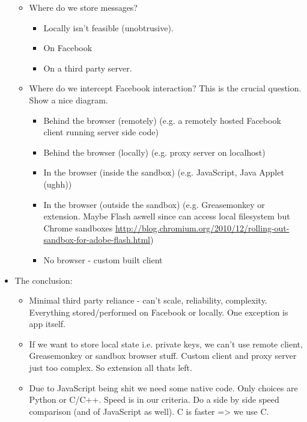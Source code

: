 \begin{itemize}
\begin{itemize}
        \item Where do we store messages?
            \begin{itemize}
                \item Locally isn't feasible (unobtrusive).
                \item On Facebook
                \item On a third party server.
            \end{itemize}
                
        \item Where do we intercept Facebook interaction? This is the crucial question. Show a nice diagram.
            \begin{itemize}
                \item Behind the browser (remotely) (e.g. a remotely hosted Facebook client running server side code)
                \item Behind the browser (locally) (e.g. proxy server on localhost)
                \item In the browser (inside the sandbox) (e.g. JavaScript, Java Applet (ughh))
                \item In the browser (outside the sandbox) (e.g. Greasemonkey or extension. Maybe Flash aswell since can access local filesystem but Chrome sandboxes \url{http://blog.chromium.org/2010/12/rolling-out-sandbox-for-adobe-flash.html})
                \item No browser - custom built client
            \end{itemize}
        \end{itemize}
        
	\item The conclusion:
            \begin{itemize}
                \item Minimal third party reliance - can't scale, reliability, complexity. Everything stored/performed on Facebook or locally. One exception is app itself.
                \item If we want to store local state i.e. private keys, we can't use remote client, Greasemonkey or sandbox browser stuff. Custom client and proxy server just too complex. So extension all thats left.
                \item Due to JavaScript being shit we need some native code. Only choices are Python or C/C++. Speed is in our criteria. Do a side by side speed comparison (and of JavaScript as well). C is faster => we use C.
            \end{itemize}
        
                
    \end{itemize}
    
